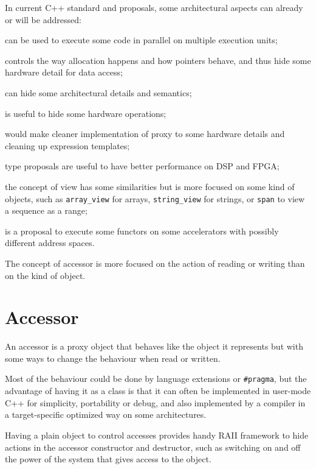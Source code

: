 \documentclass[a4paper]{article}
\begin{document}
In current C++ standard and proposals, some architectural aspects can
already or will be addressed:
\begin{description}
\item[\texttt{thread}] can be used to execute some code in parallel
  on multiple execution units;
\item[\texttt{allocator}] controls the way allocation happens and how
  pointers behave, and thus hide some hardware detail for data access;
\item[constructors and destructors] can hide some architectural details
  and semantics;
\item[operator overloading] is useful to hide some hardware
  operations;
\item[\texttt{auto} operator overloading] would make cleaner implementation of
  proxy to some hardware details and cleaning up expression templates;
\item[fixed-point] type proposals are useful to have better
  performance on DSP and FPGA;
\item the concept of view has some similarities but is more focused on
  some kind of objects, such as \lstinline|array_view| for arrays,
  \lstinline|string_view| for strings, or \lstinline|span| to view a
  sequence as a range;
\item[SYCL] is a proposal to execute some functors on some
  accelerators with possibly different address spaces.
\end{description}

The concept of accessor is more focused on the action of reading or
writing than on the kind of object.


\section{Accessor}
\label{sec:accessor}

An accessor is a proxy object that behaves like the object it
represents but with some ways to change the behaviour when read or
written.

Most of the behaviour could be done by language extensions or
\lstinline|#pragma|, but the advantage of having it as a class is that
it can often be implemented in user-mode C++ for simplicity,
portability or debug, and also implemented by a compiler in a
target-specific optimized way on some architectures.

Having a plain object to control accesses provides handy RAII
framework to hide actions in the accessor constructor and destructor,
such as switching on and off the power of the system that gives access
to the object.
\end{document}
